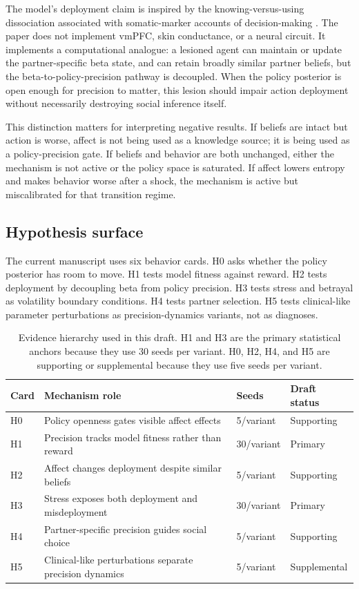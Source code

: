 The model's deployment claim is inspired by the knowing-versus-using dissociation associated with somatic-marker accounts of decision-making . The paper does not implement vmPFC, skin conductance, or a neural circuit. It implements a computational analogue: a lesioned agent can maintain or update the partner-specific beta state, and can retain broadly similar partner beliefs, but the beta-to-policy-precision pathway is decoupled. When the policy posterior is open enough for precision to matter, this lesion should impair action deployment without necessarily destroying social inference itself.

This distinction matters for interpreting negative results. If beliefs are intact but action is worse, affect is not being used as a knowledge source; it is being used as a policy-precision gate. If beliefs and behavior are both unchanged, either the mechanism is not active or the policy space is saturated. If affect lowers entropy and makes behavior worse after a shock, the mechanism is active but miscalibrated for that transition regime.

\subsection{Hypothesis surface}

The current manuscript uses six behavior cards. H0 asks whether the policy posterior has room to move. H1 tests model fitness against reward. H2 tests deployment by decoupling beta from policy precision. H3 tests stress and betrayal as volatility boundary conditions. H4 tests partner selection. H5 tests clinical-like parameter perturbations as precision-dynamics variants, not as diagnoses.

\begin{table}[t]
\centering
\caption{Evidence hierarchy used in this draft. H1 and H3 are the primary statistical anchors because they use 30 seeds per variant. H0, H2, H4, and H5 are supporting or supplemental because they use five seeds per variant.}
\label{tab:evidence-hierarchy}
\begin{tabularx}{\linewidth}{lXll}
\toprule
Card & Mechanism role & Seeds & Draft status \\
\midrule
H0 & Policy openness gates visible affect effects & 5/variant & Supporting \\
H1 & Precision tracks model fitness rather than reward & 30/variant & Primary \\
H2 & Affect changes deployment despite similar beliefs & 5/variant & Supporting \\
H3 & Stress exposes both deployment and misdeployment & 30/variant & Primary \\
H4 & Partner-specific precision guides social choice & 5/variant & Supporting \\
H5 & Clinical-like perturbations separate precision dynamics & 5/variant & Supplemental \\
\bottomrule
\end{tabularx}
\end{table}
